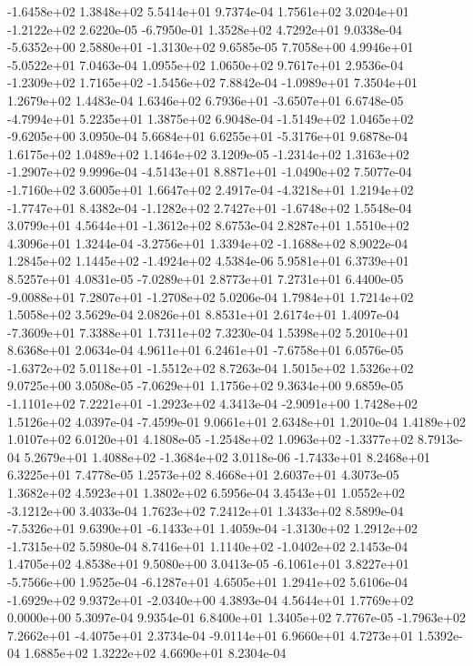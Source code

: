 -1.6458e+02  1.3848e+02  5.5414e+01  9.7374e-04
 1.7561e+02  3.0204e+01 -1.2122e+02  2.6220e-05
-6.7950e-01  1.3528e+02  4.7292e+01  9.0338e-04
-5.6352e+00  2.5880e+01 -1.3130e+02  9.6585e-05
 7.7058e+00  4.9946e+01 -5.0522e+01  7.0463e-04
1.0955e+02 1.0650e+02 9.7617e+01  2.9536e-04
-1.2309e+02  1.7165e+02 -1.5456e+02  7.8842e-04
-1.0989e+01  7.3504e+01  1.2679e+02  1.4483e-04
 1.6346e+02  6.7936e+01 -3.6507e+01  6.6748e-05
-4.7994e+01  5.2235e+01  1.3875e+02  6.9048e-04
-1.5149e+02  1.0465e+02 -9.6205e+00  3.0950e-04
 5.6684e+01  6.6255e+01 -5.3176e+01  9.6878e-04
1.6175e+02 1.0489e+02 1.1464e+02  3.1209e-05
-1.2314e+02  1.3163e+02 -1.2907e+02  9.9996e-04
-4.5143e+01  8.8871e+01 -1.0490e+02  7.5077e-04
-1.7160e+02  3.6005e+01  1.6647e+02  2.4917e-04
-4.3218e+01  1.2194e+02 -1.7747e+01  8.4382e-04
-1.1282e+02  2.7427e+01 -1.6748e+02  1.5548e-04
 3.0799e+01  4.5644e+01 -1.3612e+02  8.6753e-04
2.8287e+01 1.5510e+02 4.3096e+01  1.3244e-04
-3.2756e+01  1.3394e+02 -1.1688e+02  8.9022e-04
 1.2845e+02  1.1445e+02 -1.4924e+02  4.5384e-06
5.9581e+01 6.3739e+01 8.5257e+01  4.0831e-05
-7.0289e+01  2.8773e+01  7.2731e+01  6.4400e-05
-9.0088e+01  7.2807e+01 -1.2708e+02  5.0206e-04
1.7984e+01 1.7214e+02 1.5058e+02  3.5629e-04
2.0826e+01 8.8531e+01 2.6174e+01  1.4097e-04
-7.3609e+01  7.3388e+01  1.7311e+02  7.3230e-04
1.5398e+02 5.2010e+01 8.6368e+01  2.0634e-04
 4.9611e+01  6.2461e+01 -7.6758e+01  6.0576e-05
-1.6372e+02  5.0118e+01 -1.5512e+02  8.7263e-04
1.5015e+02 1.5326e+02 9.0725e+00  3.0508e-05
-7.0629e+01  1.1756e+02  9.3634e+00  9.6859e-05
-1.1101e+02  7.2221e+01 -1.2923e+02  4.3413e-04
-2.9091e+00  1.7428e+02  1.5126e+02  4.0397e-04
-7.4599e-01  9.0661e+01  2.6348e+01  1.2010e-04
1.4189e+02 1.0107e+02 6.0120e+01  4.1808e-05
-1.2548e+02  1.0963e+02 -1.3377e+02  8.7913e-04
 5.2679e+01  1.4088e+02 -1.3684e+02  3.0118e-06
-1.7433e+01  8.2468e+01  6.3225e+01  7.4778e-05
1.2573e+02 8.4668e+01 2.6037e+01  4.3073e-05
1.3682e+02 4.5923e+01 1.3802e+02  6.5956e-04
 3.4543e+01  1.0552e+02 -3.1212e+00  3.4033e-04
1.7623e+02 7.2412e+01 1.3433e+02  8.5899e-04
-7.5326e+01  9.6390e+01 -6.1433e+01  1.4059e-04
-1.3130e+02  1.2912e+02 -1.7315e+02  5.5980e-04
 8.7416e+01  1.1140e+02 -1.0402e+02  2.1453e-04
1.4705e+02 4.8538e+01 9.5080e+00  3.0413e-05
-6.1061e+01  3.8227e+01 -5.7566e+00  1.9525e-04
-6.1287e+01  4.6505e+01  1.2941e+02  5.6106e-04
-1.6929e+02  9.9372e+01 -2.0340e+00  4.3893e-04
4.5644e+01 1.7769e+02 0.0000e+00  5.3097e-04
9.9354e-01 6.8400e+01 1.3405e+02  7.7767e-05
-1.7963e+02  7.2662e+01 -4.4075e+01  2.3734e-04
-9.0114e+01  6.9660e+01  4.7273e+01  1.5392e-04
1.6885e+02 1.3222e+02 4.6690e+01  8.2304e-04
